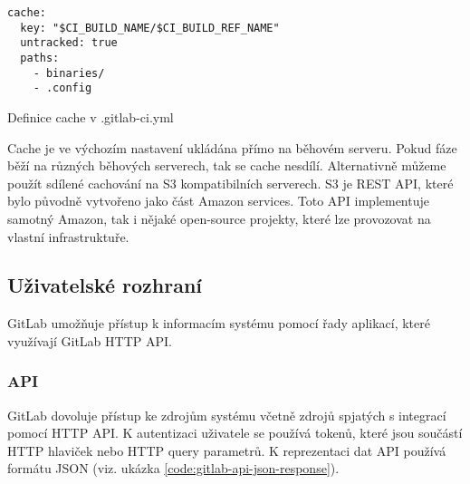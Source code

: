 \begin{listing}[ht]
\begin{verbatim}
cache:
  key: "$CI_BUILD_NAME/$CI_BUILD_REF_NAME"
  untracked: true
  paths:
    - binaries/
    - .config
\end{verbatim}
\caption{Definice cache v .gitlab-ci.yml}
\end{listing}


Cache je ve výchozím nastavení ukládána přímo na běhovém serveru.
Pokud fáze běží na různých běhových serverech, tak se cache nesdílí.
Alternativně můžeme použít sdílené cachování na S3 kompatibilních serverech.
S3 je REST API, které bylo původně vytvořeno jako část Amazon services.
Toto API implementuje samotný Amazon, tak i nějaké open-source projekty, které lze provozovat na vlastní infrastruktuře.


\subsection{Uživatelské rozhraní}

GitLab umožňuje přístup k informacím systému pomocí řady aplikací, které využívají GitLab HTTP API.

\subsubsection{API}

GitLab dovoluje přístup ke zdrojům systému včetně zdrojů spjatých s integrací pomocí HTTP API.
K autentizaci uživatele se používá tokenů, které jsou součástí HTTP hlaviček nebo HTTP query parametrů.
K reprezentaci dat API používá formátu JSON (viz. ukázka \ref{code:gitlab-api-json-response}).


